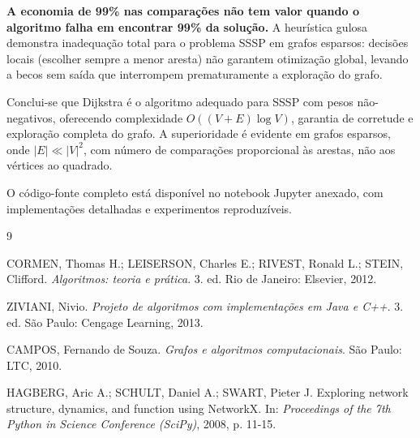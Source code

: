\documentclass[12pt,a4paper]{article}
\begin{document}
\textbf{A economia de 99\% nas comparações não tem valor quando o algoritmo falha em encontrar 99\% da solução.} A heurística gulosa demonstra inadequação total para o problema SSSP em grafos esparsos: decisões locais (escolher sempre a menor aresta) não garantem otimização global, levando a becos sem saída que interrompem prematuramente a exploração do grafo.

Conclui-se que Dijkstra é o algoritmo adequado para SSSP com pesos não-negativos, oferecendo complexidade $O((V+E)\log V)$, garantia de corretude e exploração completa do grafo. A superioridade é evidente em grafos esparsos, onde $|E| \ll |V|^2$, com número de comparações proporcional às arestas, não aos vértices ao quadrado.

O código-fonte completo está disponível no notebook Jupyter anexado, com implementações detalhadas e experimentos reproduzíveis.


\newpage
\begin{thebibliography}{9}

CORMEN, Thomas H.; LEISERSON, Charles E.; RIVEST, Ronald L.; STEIN, Clifford. 
\textit{Algoritmos: teoria e prática}. 3. ed. Rio de Janeiro: Elsevier, 2012.

ZIVIANI, Nivio. 
\textit{Projeto de algoritmos com implementações em Java e C++}. 3. ed. São Paulo: Cengage Learning, 2013.

CAMPOS, Fernando de Souza. 
\textit{Grafos e algoritmos computacionais}. São Paulo: LTC, 2010.

HAGBERG, Aric A.; SCHULT, Daniel A.; SWART, Pieter J. 
Exploring network structure, dynamics, and function using NetworkX. In: \textit{Proceedings of the 7th Python in Science Conference (SciPy)}, 2008, p. 11-15.

\end{thebibliography}
\end{document}
